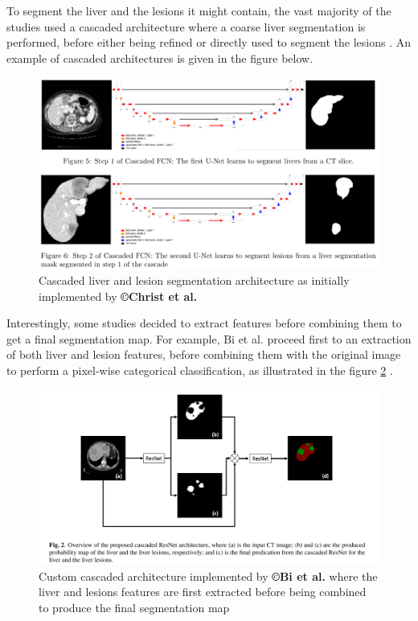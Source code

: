 \documentclass[]{article}
\begin{document}
	To segment the liver and the lesions it might contain, the vast majority
	of the studies used a cascaded architecture where a coarse liver
	segmentation is performed, before either being refined \cite{Yuan2017} or directly used to segment the lesions \cite{Han2017, Li2018, Kaluva2018, Ben-Cohen, Christ2017}. An example of cascaded architectures is
	given in the figure below. 
	\begin{figure}[th!]
		\centering
		\includegraphics[width=0.7\linewidth]{images/image35}
		\caption{Cascaded liver and lesion segmentation architecture as initially implemented by \textbf{©Christ et al.} \cite{Christ2017}}
		\label{Cascade_Christ}
	\end{figure}
	
	Interestingly, some studies decided to extract features before combining
	them to get a final segmentation map. For example, Bi et al.
	proceed first to an extraction of both liver and lesion features, before
	combining them with the original image to perform a pixel-wise
	categorical classification, as illustrated in the figure \ref{Bi2017_Fig2} \cite{Bi2017}.
	
	\begin{figure}[th!]
		\centering
		\includegraphics[width=0.7\linewidth]{images/image27}
		\caption{Custom cascaded architecture implemented by \textbf{©Bi et al.} where the liver and lesions features are first extracted before being combined to produce the final segmentation map \cite{Bi2017}}
		\label{Bi2017_Fig2}
	\end{figure}
	
\end{document}
